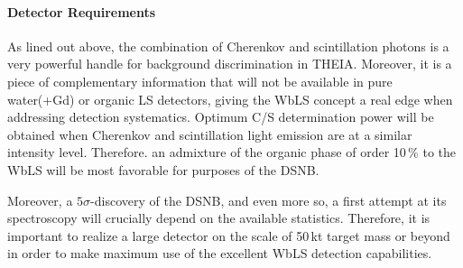 \paragraph{Detector Requirements}
As lined out above, the combination of Cherenkov and scintillation photons is a very powerful handle for background discrimination in THEIA. Moreover, it is a piece of complementary information that will not be available in pure water(+Gd) or organic LS detectors, giving the WbLS concept a real edge when addressing detection systematics. Optimum C/S determination power will be obtained when Cherenkov and scintillation light emission are at a similar intensity level. Therefore. an admixture of the organic phase of order 10\,\% to the WbLS will be most favorable for purposes of the DSNB.

Moreover, a $5\sigma$-discovery of the DSNB, and even more so, a first attempt at its spectroscopy will crucially depend on the available statistics. Therefore, it is important to realize a large detector on the scale of 50\,kt target mass or beyond in order to make maximum use of the excellent WbLS detection capabilities.
